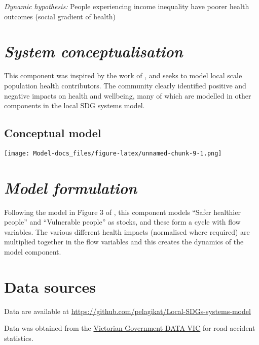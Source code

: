 \documentclass[
  11pt,
]{book}
\begin{document}
\emph{Dynamic hypothesis:}
People experiencing income inequality have poorer health outcomes (social gradient of health)

\hypertarget{system-conceptualisation-4}{%
\section{\texorpdfstring{\emph{System conceptualisation}}{System conceptualisation}}\label{system-conceptualisation-4}}

This component was inspired by the work of \citet{homer_system_2006}, and seeks to model local scale population health contributors. The community clearly identified positive and negative impacts on health and wellbeing, many of which are modelled in other components in the local SDG systems model.

\hypertarget{conceptual-model-6}{%
\subsection{Conceptual model}\label{conceptual-model-6}}

\texttt{[image: Model-docs\_files/figure-latex/unnamed-chunk-9-1.png]}

\hypertarget{model-formulation-4}{%
\section{\texorpdfstring{\emph{Model formulation}}{Model formulation}}\label{model-formulation-4}}

Following the model in Figure 3 of \citet{homer_system_2006}, this component models ``Safer healthier people'' and ``Vulnerable people'' as stocks, and these form a cycle with flow variables. The various different health impacts (normalised where required) are multiplied together in the flow variables and this creates the dynamics of the model component.

\hypertarget{data-sources-6}{%
\section{Data sources}\label{data-sources-6}}

Data are available at \url{https://github.com/pelagikat/Local-SDGs-systems-model}

Data was obtained from the \href{https://discover.data.vic.gov.au/dataset/crash-stats-data-extract}{Victorian Government DATA VIC} for road accident statistics.
\end{document}
